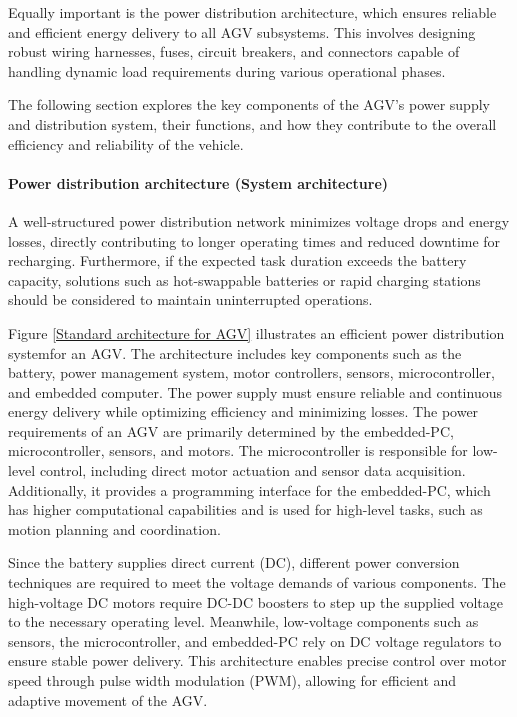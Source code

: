 \documentclass[../../main]{subfiles}
\begin{document}
Equally important is the power distribution architecture, which 
ensures reliable and efficient energy delivery to all AGV subsystems. 
This involves designing robust wiring harnesses, fuses, circuit 
breakers, and connectors capable of handling dynamic load 
requirements during various operational phases.

The following section explores the key components of the AGV's 
power supply and distribution system, their functions, and how 
they contribute to the overall efficiency and reliability of the vehicle.

\paragraph{Power distribution architecture (System architecture)}

A well-structured power distribution network minimizes voltage drops and energy 
losses, directly contributing to longer operating times and reduced 
downtime for recharging. Furthermore, if the expected task duration 
exceeds the battery capacity, solutions such as hot-swappable 
batteries or rapid charging stations should be considered to maintain 
uninterrupted operations.

Figure \ref{Standard architecture for AGV} illustrates an efficient 
power distribution system\cite{system_architecture}for an AGV. The architecture 
includes key components such as the battery, 
power management system, motor controllers, sensors, 
microcontroller, and embedded computer. The power 
supply must ensure reliable and continuous energy 
delivery while optimizing efficiency and minimizing losses.
The power requirements of an AGV are primarily determined by 
the embedded-PC, microcontroller, sensors, and motors. 
The microcontroller is responsible for low-level control, 
including direct motor actuation and sensor data acquisition. 
Additionally, it provides a programming interface for the 
embedded-PC, which has higher computational capabilities 
and is used for high-level tasks, such as motion planning 
and coordination.

Since the battery supplies direct current (DC), different 
power conversion techniques are required to meet the voltage 
demands of various components. The high-voltage DC motors 
require DC-DC boosters to step up the supplied voltage to 
the necessary operating level. Meanwhile, low-voltage components 
such as sensors, the microcontroller, and embedded-PC rely on 
DC voltage regulators to ensure stable power delivery. 
This architecture enables precise control over motor speed 
through pulse width modulation (PWM), allowing for 
efficient and adaptive movement of the AGV.
\end{document}
